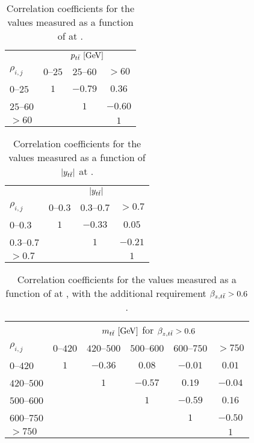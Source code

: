 \begin{table}[!htp]\centering
\begin{tabular}{l c c c }
  \toprule
  &\multicolumn{3}{c}{$p_{t\bar{t}}{}~[\rm{GeV}]$}    \\
  $\rho_{i,j}$      &     $0$--$25$           &        $25$--$60$         &  $>60$            \\
  \midrule
  $0$--$25$       &    $1$    &    $-0.79$  &   $0.36$  \\
  $25$--$60$      &           &    $1$      &   $-0.60$ \\
  $>60$           &           &             &   $1$     \\
  \bottomrule
\end{tabular}
\caption{Correlation coefficients for the \ac{} values measured as a
  function of \pttt{} at \seventev{}.}
\label{tab:corr_pttt}
\end{table}

\begin{table}[!htp]\centering
\begin{tabular}{l c c c }
  \toprule
  &\multicolumn{3}{c}{$|y_{t\bar{t}}{}|$}    \\
  $\rho_{i,j}$      &  $0$--$0.3$   &  $0.3$--$0.7$  &  $>0.7$  \\
  \midrule
  $0$--$0.3$    &   $1$   &   $-0.33$  &   $0.05$   \\
  $0.3$--$0.7$  &         &   $1$      &   $-0.21$  \\
  $>0.7$        &         &            &   $1$      \\
  \bottomrule
\end{tabular}
\caption{Correlation coefficients for the \ac{} values measured as a
  function of $|y_{t\bar{t}}{}|$ at \seventev{}.}
\label{tab:corr_ytt}
\end{table}

\begin{table}[!htp]\centering
\begin{tabular}{l c c c c c }
  \toprule
  &\multicolumn{5}{c}{$m_{t\bar{t}}{}~[\rm{GeV}]$ for $\beta_{z,t\bar{t}}{}> 0.6$}    \\
  $\rho_{i,j}$ & $0$--$420$ & $420$--$500$ & $500$--$600$ & $600$--$750$ & $>750$ \\
  \midrule
  $0$--$420$      & $1$ & $-0.36$ & $0.08$  & $-0.01$ & $0.01$  \\
  $420$--$500$    &     & $1$     & $-0.57$ & $0.19$  & $-0.04$ \\
  $500$--$600$    &     &         & $1$     & $-0.59$ & $0.16$  \\
  $600$--$750$    &     &         &         & $1$     & $-0.50$ \\
  $>750$          &     &         &         &         & $1$     \\
  \bottomrule
\end{tabular}
\caption{Correlation coefficients for the \ac{} values measured as a
  function of \mtt{} at \seventev{}, with the additional requirement $\beta_{z,t\bar{t}}{}>0.6$.}
\label{tab:corr_mtt_beta}
\end{table}

